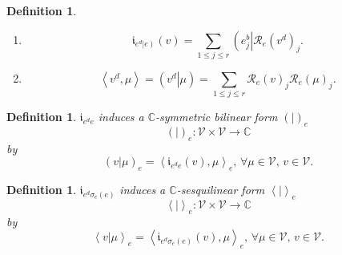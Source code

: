 \documentclass[aps,preprint]{revtex4}%
\newtheorem{definition}[theorem]{Definition}
\begin{document}
\begin{definition}
\begin{enumerate}
\begin{enumerate}
\item
\begin{equation}
\mathfrak{i}_{e^{d}\left\vert e\right)  }\left(  v\right)  =\sum_{1\leq j\leq
r}\left(  e_{j}^{b}\right\vert \mathcal{R}_{e}\left(  v^{d}\right)  _{j}.
\end{equation}


\item
\begin{equation}
\left\langle v^{d},\mu\right\rangle =\left(  \left.  v^{d}\right\vert
\mu\right)  =\sum_{1\leq j\leq r}\mathcal{R}_{e}\left(  v\right)
_{j}\mathcal{R}_{e}\left(  \mu\right)  _{j}.
\end{equation}

\end{enumerate}
\end{enumerate}
\end{definition}

\begin{definition}
$\mathfrak{i}_{e^{d}e}$ induces a $\mathbb{C}$-symmetric bilinear form
$\left(  \left.  {}\right\vert \right)  _{e}$%
\begin{equation}
\left(  \left.  {}\right\vert \right)  _{e}:\mathcal{V\times V}\rightarrow
\mathbb{C}%
\end{equation}
by
\begin{equation}
\left(  \left.  v\right\vert \mu\right)  _{e}=\left\langle \mathfrak{i}%
_{e^{d}e}\left(  v\right)  ,\mu\right\rangle _{e},\,\forall\mu\in
\mathcal{V},\,v\in\mathcal{V}.
\end{equation}

\end{definition}

\begin{definition}
$\mathfrak{i}_{e^{d}\sigma_{e}\left(  e\right)  }$ induces a $\mathbb{C}%
$-sesquilinear form $\left\langle \left.  {}\right\vert \right\rangle _{e}$%
\begin{equation}
\left\langle \left.  {}\right\vert \right\rangle _{e}:\mathcal{V\times
V}\rightarrow\mathbb{C}%
\end{equation}
by
\begin{equation}
\left\langle \left.  v\right\vert \mu\right\rangle _{e}=\left\langle
\mathfrak{i}_{e^{d}\sigma_{e}\left(  e\right)  }\left(  v\right)
,\mu\right\rangle _{e},\,\forall\mu\in\mathcal{V},\,v\in\mathcal{V}.
\end{equation}

\end{definition}
\end{document}
